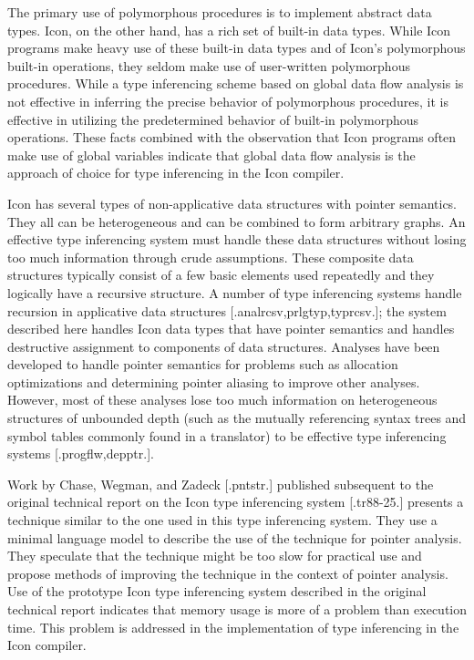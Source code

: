 The primary use of polymorphous procedures is to implement abstract
data types. Icon, on the other hand, has a rich set of built-in data
types. While Icon programs make heavy use of these built-in data types
and of Icon's polymorphous built-in operations, they seldom make use
of user-written polymorphous procedures. While a type inferencing
scheme based on global data flow analysis is not effective in
inferring the precise behavior of polymorphous procedures, it is
effective in utilizing the predetermined behavior of built-in
polymorphous operations. These facts combined with the observation
that Icon programs often make use of global variables indicate that
global data flow analysis is the approach of choice for type
inferencing in the Icon compiler.

Icon has several types of non-applicative data structures with pointer
semantics. They all can be heterogeneous and can be combined to form
arbitrary graphs. An effective type inferencing system must handle
these data structures without losing too much information through
crude assumptions. These composite data structures typically consist
of a few basic elements used repeatedly and they logically have a
recursive structure. A number of type inferencing systems handle
recursion in applicative data structures [.analrcsv,prlgtyp,typrcsv.];
the system described here handles Icon data types that have pointer
semantics and handles destructive assignment to components of data
structures. Analyses have been developed to handle pointer semantics
for problems such as allocation optimizations and determining pointer
aliasing to improve other analyses. However, most of these analyses
lose too much information on heterogeneous structures of unbounded
depth (such as the mutually referencing syntax trees and symbol tables
commonly found in a translator) to be effective type inferencing
systems [.progflw,depptr.].

Work by Chase, Wegman, and Zadeck [.pntstr.] published subsequent to
the original technical report on the Icon type inferencing system
[.tr88-25.] presents a technique similar to the one used in this type
inferencing system. They use a minimal language model to describe the
use of the technique for pointer analysis. They speculate that the
technique might be too slow for practical use and propose methods of
improving the technique in the context of pointer analysis.  Use of
the prototype Icon type inferencing system described in the original
technical report indicates that memory usage is more of a problem than
execution time. This problem is addressed in the implementation of
type inferencing in the Icon compiler.

